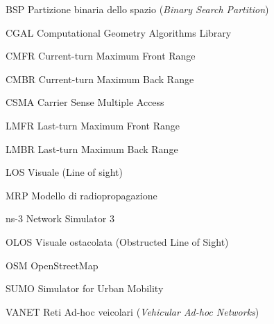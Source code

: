 \begin{abbreviations}

\item[BSP] Partizione binaria dello spazio (\textit{Binary Search Partition})
\item[CGAL] Computational Geometry Algorithms Library
\item[CMFR] Current-turn Maximum Front Range
\item[CMBR] Current-turn Maximum Back Range
\item[CSMA] Carrier Sense Multiple Access
\item[LMFR] Last-turn Maximum Front Range
\item[LMBR] Last-turn Maximum Back Range
\item[LOS] Visuale (Line of sight)
\item[MRP] Modello di radiopropagazione
\item[ns-3] Network Simulator 3
\item[OLOS] Visuale ostacolata (Obstructed Line of Sight)
\item[OSM] OpenStreetMap
\item[SUMO] Simulator for Urban Mobility
\item[VANET] Reti Ad-hoc veicolari (\textit{Vehicular Ad-hoc Networks})

\end{abbreviations}
